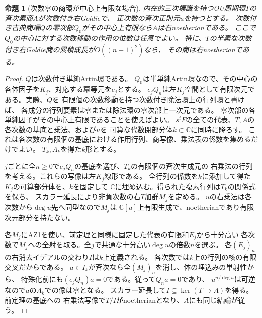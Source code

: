 \documentclass[11pt,a4paper]{ltjsarticle}
\newtheorem{proposition}[theorem]{命題}
\theoremstyle{definition}
\begin{document}
\begin{proposition}[次数零の商環が中心上有限な場合]
\label{prop:ou-small-birational-pi}
内在的三次標識を持つOU周期環$T$の斉次素商$A$が次数付き右Goldieで、
正次数の斉次正則元$u$を持つとする。
次数付き古典商環$Q$の零次部$Q_0$がその中心上有限なら$A$は右noetherianである。
ここで$Q_0$の中心に対する次数移動の作用の位数は任意でよい。
特に、$T$の半素な次数付き右Goldie商の累積成長が$O((n+1)^2)$なら、
その商は右noetherianである。
\end{proposition}
\begin{proof}
$Q$は次数付き単純Artin環である。
$Q_0$は半単純Artin環なので、その中心の各体因子を$K_j$、対応する冪等元を$e_j$とする。
$e_jQ_n$は左$K_j$空間として有限次元である。実際、$Q$を
有限個の次数移動を持つ次数付き除法環上の行列環と書けば、
各成分の行列要素は零または除法環の零次部上一次元である。
零次部の各単純因子がその中心上有限であることを使えばよい。
$s^iF$の全ての代表、$T,A$の各次数の基底と乗法、および$u$を
可算な代数閉部分体$k\subset\mathbb C$に同時に降ろす。
これは各次数の有限個の基底における作用行列、商写像、乗法表の係数を集めるだけでよい。
$T_k,A_k$を得た$k$形とする。

$j$ごとに全$n\ge0$で$e_jQ_n$の基底を選び、$T_k$の有限個の斉次生成元の
右乗法の行列を考える。これらの写像は左$K_j$線形である。
全行列の係数を$k$に添加して得た$K_j$の可算部分体を、$k$を固定して
$\mathbb C$に埋め込む。得られた複素行列は$T_k$の関係式を保ち、
スカラー延長により非負次数の右$T$加群$M_j$を定める。
$u$の右乗法は各次数から$\deg u$先へ同型なので$M_j$は
$\mathbb C[u]$上有限生成で、noetherianであり有限次元部分を持たない。

各$M_j$にAZ1を使い、前定理と同様に固定した代表の有限和$E_j$から十分高い
各次数で$M_j$への全射を取る。全$j$で共通な十分高い$\deg u$の倍数$n$を選ぶ。
各$(E_j)_n$の右消去イデアルの交わり$I$は$k$上定義される。
各次数では$k$上の行列の核の有限交叉だからである。
$a\in I_k$が斉次なら全$(M_j)_n$を消し、体の埋込みの単射性から、
特殊化前にも$(e_jQ_n)a=0$である。従って$Q_na=0$であり、
$u^{n/\deg u}$は可逆なので$a$の$A_k$での像は零となる。
スカラー延長して$I\subseteq\ker(T\to A)$を得る。前定理の基底への
右乗法写像で$T/I$がnoetherianとなり、$A$にも同じ結論が従う。


\end{proof}
\end{document}
